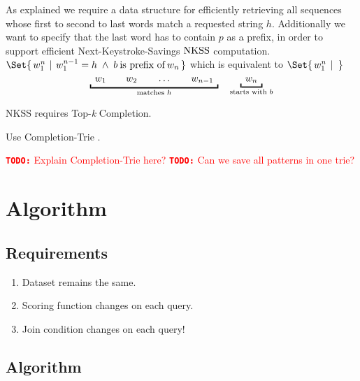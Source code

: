 \documentclass[11pt,a4paper]{report}
\newcommand\Givenbase[1][]{\,#1\lvert\,}
\let\Given\Givenbase
\newcommand{\todo}[1]{\textcolor{red}{{\footnotesize\textbf{\texttt{TODO:}}} #1}}
\begin{document}
As explained we require a data structure for efficiently retrieving all
sequences whose first to second to last words match a requested string $h$.
Additionally we want to specify that the last word has to contain $p$ as a
prefix, in order to support efficient Next-Keystroke-Savings $\NKSS$
computation.
\mbox{$\Set{\, w_1^n \: \Given \: w_1^{n-1} = h \; \land \; b \:\text{is prefix of}\: w_n \,}$}
which is equivalent to
\mbox{$\Set{\, w_1^n \: \Given \: \,}$}
\begin{equation*}
  \underbracket{\enskip w_1 \qquad w_2 \qquad \ldots \qquad w_{n-1} \enskip}
    _\text{matches $h$}
  \quad
  \underbracket{\enskip w_n \enskip}_\text{starts with $b$}
\end{equation*}

NKSS requires Top-\emph{k} Completion.

Use Completion-Trie \parencite{HsuOttaviano2013}.

\todo{Explain Completion-Trie here?}
\todo{Can we save all patterns in one trie?}

\section{Algorithm}
\label{sec:algorithm}

\subsection{Requirements}

\begin{enumerate}
  \item Dataset remains the same.
  \item Scoring function changes on each query.
  \item Join condition changes on each query!
\end{enumerate}

\subsection{Algorithm}
\end{document}
